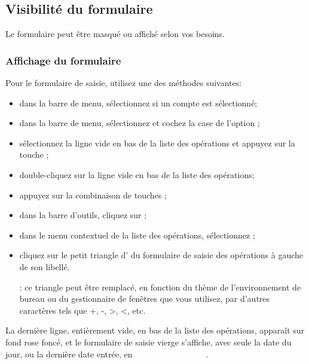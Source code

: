\subsection{Visibilité du formulaire\label{transactions-form-exposure}}

Le formulaire peut être masqué ou affiché selon vos besoins.


\subsubsection{Affichage du formulaire\label{transactions-form-exposure-display}}

Pour  le formulaire de saisie, utilisez une des méthodes suivantes:

\begin{itemize}
	\item dans la barre de menu, sélectionnez  si un compte est sélectionné;
	\item dans la barre de menu, sélectionnez  et cochez la case de l'option ;
	\item sélectionnez la ligne vide en bas de la liste des opérations et appuyez sur la touche ;
	\item double-cliquez sur la ligne vide en bas de la liste des opérations;
	\item appuyez sur la combinaison de touches ;
	\item dans la barre d'outils, cliquez sur ;
	\item dans le menu contextuel de la liste des opérations, sélectionnez ;
	\item cliquez sur le petit triangle d' du formulaire de saisie des opérations à gauche de son libellé.
	
	\Note{}: ce triangle peut être remplacé, en fonction du thème de l'environnement de bureau ou du gestionnaire de fenêtres que vous utilisez, par d'autres caractères tels que +, -, >, <, etc.
\end{itemize}

La dernière ligne, entièrement vide, en bas de la liste des opérations, apparaît sur \colorbox[RGB]{245,155,155}{fond rose foncé}, et le formulaire de saisie vierge s'affiche, avec seule la date du jour, ou la dernière date entrée, en \colorbox[RGB]{61,174,233}{\textcolor{white}{\textsf{blanc sur fond bleu}}}.


